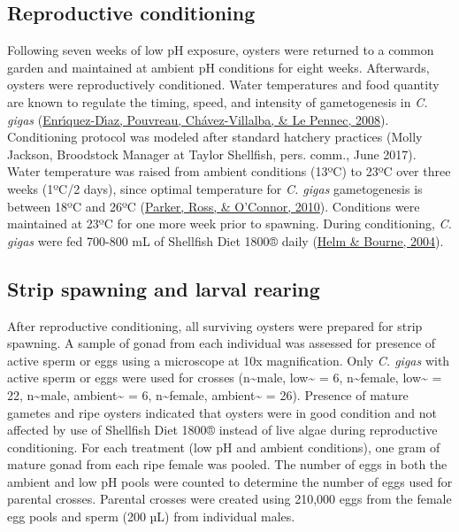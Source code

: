 \documentclass [11pt, proquest] {uwthesis}[2015/03/03]
\begin{document}
\hypertarget{reproductive-conditioning}{%
\subsection{Reproductive conditioning}\label{reproductive-conditioning}}

Following seven weeks of low pH exposure, oysters were returned to a common garden and maintained at ambient pH conditions for eight weeks. Afterwards, oysters were reproductively conditioned. Water temperatures and food quantity are known to regulate the timing, speed, and intensity of gametogenesis in \emph{C. gigas} (\protect\hyperlink{ref-Enriquez-Diaz2008}{Enrı́quez-Dı́az, Pouvreau, Chávez-Villalba, \& Le Pennec, 2008}). Conditioning protocol was modeled after standard hatchery practices (Molly Jackson, Broodstock Manager at Taylor Shellfish, pers. comm., June 2017). Water temperature was raised from ambient conditions (13ºC) to 23ºC over three weeks (1ºC/2 days), since optimal temperature for \emph{C. gigas} gametogenesis is between 18ºC and 26ºC (\protect\hyperlink{ref-Parker2010}{Parker, Ross, \& O'Connor, 2010}). Conditions were maintained at 23ºC for one more week prior to spawning. During conditioning, \emph{C. gigas} were fed 700-800 mL of Shellfish Diet 1800® daily (\protect\hyperlink{ref-Helm2004}{Helm \& Bourne, 2004}).

\hypertarget{strip-spawning-and-larval-rearing}{%
\subsection{Strip spawning and larval rearing}\label{strip-spawning-and-larval-rearing}}

After reproductive conditioning, all surviving oysters were prepared for strip spawning. A sample of gonad from each individual was assessed for presence of active sperm or eggs using a microscope at 10x magnification. Only \emph{C. gigas} with active sperm or eggs were used for crosses (n\textasciitilde male, low\textasciitilde{} = 6, n\textasciitilde female, low\textasciitilde{} = 22, n\textasciitilde male, ambient\textasciitilde{} = 6, n\textasciitilde female, ambient\textasciitilde{} = 26). Presence of mature gametes and ripe oysters indicated that oysters were in good condition and not affected by use of Shellfish Diet 1800® instead of live algae during reproductive conditioning. For each treatment (low pH and ambient conditions), one gram of mature gonad from each ripe female was pooled. The number of eggs in both the ambient and low pH pools were counted to determine the number of eggs used for parental crosses. Parental crosses were created using 210,000 eggs from the female egg pools and sperm (200 µL) from individual males.
\end{document}
